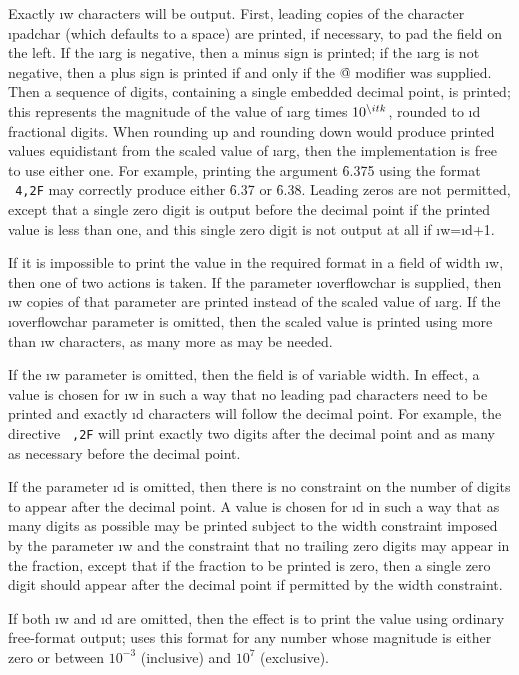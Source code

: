 Exactly \i{w} characters will
be output.  First, leading copies of the character \i{padchar}
(which defaults to a space) are printed, if necessary, to pad the
field on the left.
If the \i{arg} is negative, then a minus sign is printed;
if the \i{arg} is not negative, then a plus sign is printed
if and only if the \f{@}
modifier was supplied.  Then a sequence
of digits, containing a single embedded decimal point, is printed;
this represents the magnitude of the value of \i{arg} times $10^\i{k}$,
rounded to \i{d} fractional digits.                         
When rounding up and rounding down would produce printed values
equidistant from the scaled value of \i{arg}, then the implementation
is free to use either one.  For example, printing the argument
\f{6.375} using the format {\tt ~4,2F} may correctly produce
either \f{6.37} or \f{6.38}.
Leading zeros are not permitted, except that a single
zero digit is output before the decimal point if the printed value
is less than one, and this single zero digit is not output
at all if \i{w}=\i{d}+1.

If it is impossible to print the value in the required format in a field
of width \i{w}, then one of two actions is taken.  If the
parameter \i{overflowchar} is supplied, then \i{w} copies of that
parameter are printed instead of the scaled value of \i{arg}.
If the \i{overflowchar} parameter is omitted, then the scaled value
is printed using more than \i{w} characters, as many more as may be
needed.

If the \i{w} parameter is omitted, then the field is of variable width.
In effect, a value is chosen
for \i{w} in such a way that no leading pad characters need to be printed
and exactly \i{d} characters will follow the decimal point.
For example, the directive {\tt ~,2F} will print exactly
two digits after the decimal point and as many as necessary before the
decimal point.

If the parameter \i{d} is omitted, then there is no constraint
on the number of digits to appear after the decimal point.
A value is chosen for \i{d} in such a way that as many digits
as possible may be printed subject to the width constraint
imposed by the parameter \i{w} and the constraint that no trailing
zero digits may appear in the fraction, except that if the
fraction to be printed is zero, then a single zero digit should
appear after the decimal point if permitted by the width constraint.

If both \i{w} and \i{d} are omitted, then the effect is to print
the value using ordinary free-format output;  uses this format
for any number whose magnitude is either zero or between
$10^{-3}$ (inclusive) and $10^7$ (exclusive).

